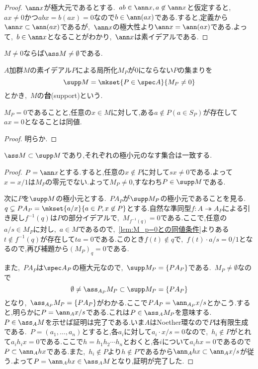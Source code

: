 \begin{proof}
	$\ann x$が極大元であるとする.~$ab\in\ann x,a\not\in\ann x$と仮定すると,~$ax\neq0$かつ$abx=b(ax)=0$なので$b\in\ann(ax)$である.すると,定義から$\ann x\subset\ann(ax)$であるが,~$\ann x$の極大性より$\ann x=\ann(ax)$である.よって,~$b\in\ann x$となることがわかり,~$\ann x$は素イデアルである.
\end{proof}

\begin{cor}\label{cor:Mneq0ならass Mは空でない}
	$M\neq0$ならば$\ass M\neq\emptyset$である.
\end{cor}

\begin{defi}[台]
	$A$加群$M$の素イデアル$ P$による局所化$M_ P$が0にならない$ P$の集まりを
	\[\supp M=\mkset{ P\in\spec A}{M_ P\neq 0}\]
	とかき,~$M$の\textbf{台}(support)という.
\end{defi}

\begin{lem}\label{lem:M_p=0との同値条件}
	$M_ P=0$であることと,任意の$x\in M$に対して,ある$a\not\in P(a\in S_ P)$が存在して$ax=0$となることは同値.
\end{lem}

\begin{proof}
	明らか.
\end{proof}

\begin{thm}\label{thm:assとsuppの極小元}
	$\ass M\subset\supp M$であり,それぞれの極小元のなす集合は一致する.
\end{thm}

\begin{proof}
	$ P=\ann x$とする.すると,任意の$x\not\in P$に対して$sx\neq0$である.よって$x=x/1$は$M_ P$の零元でない.よって$M_ P\neq0$,すなわち$ P\in\supp M$である.
	
	次に$ P$を$\supp M$の極小元とする.~$ PA_ P$が$\supp  M_ P$の極小元であることを見る.~$ q\subsetneq  PA_ P=\mkset{a/x}{a\in P,x\not\in P}$とする.自然な準同型$f:A\twoheadrightarrow A_ P$による引き戻し$f^{-1}( q)$は$ P$の部分イデアルで,~$M_{f^{-1}( q)}=0$である.ここで,任意の$a/s\in M_ P$に対し,~$a\in M$であるので,~\ref{lem:M_p=0との同値条件}よりある$t\not\in f^{-1}( q)$が存在して$ta=0$である.このとき$f(t)\not\in q$で,~$f(t)\cdot a/s=0/1$となるので,再び補題から$(M_ P)_ q=0$である.
	
	また,~$ PA_ P$は$\spec A_ P$の極大元なので,~$\supp M_ P=\{ PA_ P\}$である.~$M_ P\neq\emptyset$なので
	\[\emptyset\neq\ass_{A_ P}M_ P\subset\supp M_ P=\{ PA_ P\}\]
	となり,~$\ass_{A_ P}M_ P=\{ PA_ P\}$がわかる.ここで$ PA_ P=\ann_{A_ P}x/s$とかこう.すると,明らかに$ P=\ann_A x/s$である.これは$ P\in\ass_A M_ P$を意味する.~$ P\in\ass_A M$を示せば証明は完了である.いま$A$はNoether環なので$ P$は有限生成である.~$ P=(a_1,\dots,a_n)$とすると,各$a_i$に対して$a_i\cdot x/s=0$なので,~$h_i\not\in P$がとれて$a_ih_ix=0$である.ここで$h=h_1h_2\cdots h_n$とおくと,各$i$について$a_ihx=0$であるので$ P\subset\ann_A hx$である.また,~$h_i\not\in P$より$h\not\in P$であるから$\ann_Ahx\subset\ann_Ax/s$が従う.よって$ P=\ann_Ahx\in\ass_AM$となり,証明が完了した.
\end{proof}

